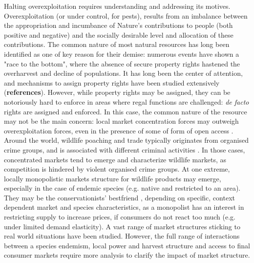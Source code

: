 	Halting overexploitation requires understanding and addressing its motives. Overexploitation (or under control, for pests), results from an imbalance between the appropriation and incumbance of Nature's contributions to people (both positive and negative) and the socially desirable level and allocation of these contributions. 	
	The common nature of most natural resources \citep{Gordon1954, smith_models_1969} has long been identified as one of key reason for their demise: numerous events have shown a "race to the bottom", where the absence of secure property rights hastened the overharvest and decline of populations. It has long been the center of attention, and mechanisms to assign property rights have been studied extensively (\textbf{references}). However, while property rights may be assigned, they can be notoriously hard to enforce in areas where regal functions are challenged: \textit{de facto} rights are assigned and enforced. In this case, the common nature of the resource may not be the main concern: local market concentration forces may outweigh overexploitation forces, even in the presence of some of form of open access \citep{damania_economics_2007}. 
Around the world, wildlife poaching and trade typically originates from organised crime groups, and is associated with different criminal activities \citep{mozer_introduction_2023}.  In those cases, concentrated markets tend to emerge and characterize wildlife markets, as competition is hindered by violent organised crime groups. At one extreme, locally monopolistic markets structure for wildlife products may emerge, especially in the case of endemic species (e.g. native and restricted to an area).
They may  be the conservationists' bestfriend \citep{solow_resources_1974, hannesson_note_1983}, depending on specific, context dependent market and species characteristics, as a monopolist has an interest in restricting supply to increase prices, if consumers do not react too much (e.g. under limited demand elasticity). A vast range of  market structures \citep{damania_economics_2007, hannesson_effects_1985} sticking to real world situations have been studied. However, the full range of interactions between a species endemism, local power and harvest structure and access to final consumer markets require more analysis to clarify the impact of market structure.
